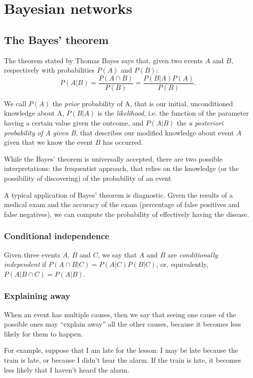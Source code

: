 \section{Bayesian networks}
\subsection{The Bayes' theorem}
The theorem stated by Thomas Bayes says that, given two events $A$ and $B$, respectively with probabilities $P(A)$ and $P(B)$:
\[ P(A|B) = \frac{P(A \cap B)}{P(B)} = \frac{P(B|A)P(A)}{P(B)}. \]

We call $P(A)$ the \textit{prior} probability of A, that is our initial, unconditioned knowledge about A, $P(B|A)$ is the \textit{likelihood}, i.e. the function of the parameter having a certain value given the outcome, and $P(A|B)$ the \textit{a posteriori probability of A given B}, that describes our modified knowledge about event $A$ given that we know the event $B$ has occurred.

While the Bayes' theorem is universally accepted, there are two possible interpretations: the frequentist approach, that relies on the knowledge (or the possibility of discovering) of the probability of an event

A typical application of Bayes' theorem is diagnostic. Given the results of a medical exam and the accuracy of the exam (percentage of false positives and false negatives), we can compute the probability of effectively having the disease.

\subsubsection{Conditional independence}
Given three events $A$, $B$ and $C$, we say that $A$ and $B$ are \textit{conditionally independent} if $P(A \cap B | C) = P(A|C)P(B|C)$, or, equivalently, $P(A | B \cap C) = P(A|B)$.

\subsubsection{Explaining away}
When an event has multiple causes, then we say that seeing one cause of the possible ones may ``explain away'' all the other causes, because it becomes less likely for them to happen.

For example, suppose that I am late for the lesson: I may be late because the train is late, or because I didn't hear the alarm. If the train is late, it becomes less likely that I haven't heard the alarm.

